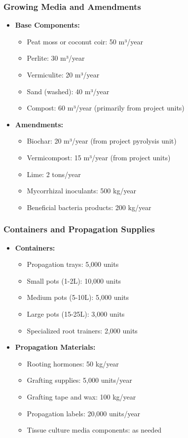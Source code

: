 \subsubsection{Growing Media and Amendments}
\begin{itemize}
    \item \textbf{Base Components:}
    \begin{itemize}
        \item Peat moss or coconut coir: 50 m³/year
        \item Perlite: 30 m³/year
        \item Vermiculite: 20 m³/year
        \item Sand (washed): 40 m³/year
        \item Compost: 60 m³/year (primarily from project units)
    \end{itemize}
    
    \item \textbf{Amendments:}
    \begin{itemize}
        \item Biochar: 20 m³/year (from project pyrolysis unit)
        \item Vermicompost: 15 m³/year (from project units)
        \item Lime: 2 tons/year
        \item Mycorrhizal inoculants: 500 kg/year
        \item Beneficial bacteria products: 200 kg/year
    \end{itemize}
\end{itemize}

\subsubsection{Containers and Propagation Supplies}
\begin{itemize}
    \item \textbf{Containers:}
    \begin{itemize}
        \item Propagation trays: 5,000 units
        \item Small pots (1-2L): 10,000 units
        \item Medium pots (5-10L): 5,000 units
        \item Large pots (15-25L): 3,000 units
        \item Specialized root trainers: 2,000 units
    \end{itemize}
    
    \item \textbf{Propagation Materials:}
    \begin{itemize}
        \item Rooting hormones: 50 kg/year
        \item Grafting supplies: 5,000 units/year
        \item Grafting tape and wax: 100 kg/year
        \item Propagation labels: 20,000 units/year
        \item Tissue culture media components: as needed
    \end{itemize}
\end{itemize}


